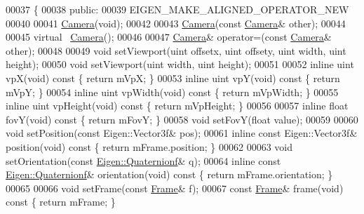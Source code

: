 \begin{DoxyCode}
00037 \{
00038   \textcolor{keyword}{public}:
00039     EIGEN\_MAKE\_ALIGNED\_OPERATOR\_NEW
00040 
00041     \hyperlink{class_camera}{Camera}(\textcolor{keywordtype}{void});
00042     
00043     \hyperlink{class_camera}{Camera}(\textcolor{keyword}{const} \hyperlink{class_camera}{Camera}& other);
00044     
00045     \textcolor{keyword}{virtual} ~\hyperlink{class_camera}{Camera}();
00046     
00047     \hyperlink{class_camera}{Camera}& operator=(\textcolor{keyword}{const} \hyperlink{class_camera}{Camera}& other);
00048     
00049     \textcolor{keywordtype}{void} setViewport(uint offsetx, uint offsety, uint width, uint height);
00050     \textcolor{keywordtype}{void} setViewport(uint width, uint height);
00051     
00052     \textcolor{keyword}{inline} uint vpX(\textcolor{keywordtype}{void})\textcolor{keyword}{ const }\{ \textcolor{keywordflow}{return} mVpX; \}
00053     \textcolor{keyword}{inline} uint vpY(\textcolor{keywordtype}{void})\textcolor{keyword}{ const }\{ \textcolor{keywordflow}{return} mVpY; \}
00054     \textcolor{keyword}{inline} uint vpWidth(\textcolor{keywordtype}{void})\textcolor{keyword}{ const }\{ \textcolor{keywordflow}{return} mVpWidth; \}
00055     \textcolor{keyword}{inline} uint vpHeight(\textcolor{keywordtype}{void})\textcolor{keyword}{ const }\{ \textcolor{keywordflow}{return} mVpHeight; \}
00056 
00057     \textcolor{keyword}{inline} \textcolor{keywordtype}{float} fovY(\textcolor{keywordtype}{void})\textcolor{keyword}{ const }\{ \textcolor{keywordflow}{return} mFovY; \}
00058     \textcolor{keywordtype}{void} setFovY(\textcolor{keywordtype}{float} value);
00059     
00060     \textcolor{keywordtype}{void} setPosition(\textcolor{keyword}{const} Eigen::Vector3f& pos);
00061     \textcolor{keyword}{inline} \textcolor{keyword}{const} Eigen::Vector3f& position(\textcolor{keywordtype}{void})\textcolor{keyword}{ const }\{ \textcolor{keywordflow}{return} mFrame.position; \}
00062 
00063     \textcolor{keywordtype}{void} setOrientation(\textcolor{keyword}{const} \hyperlink{group___geometry___module_class_eigen_1_1_quaternion}{Eigen::Quaternionf}& q);
00064     \textcolor{keyword}{inline} \textcolor{keyword}{const} \hyperlink{group___geometry___module_class_eigen_1_1_quaternion}{Eigen::Quaternionf}& orientation(\textcolor{keywordtype}{void})\textcolor{keyword}{ const }\{ \textcolor{keywordflow}{return} mFrame.orientation;
       \}
00065 
00066     \textcolor{keywordtype}{void} setFrame(\textcolor{keyword}{const} \hyperlink{class_frame}{Frame}& f);
00067     \textcolor{keyword}{const} \hyperlink{class_frame}{Frame}& frame(\textcolor{keywordtype}{void})\textcolor{keyword}{ const }\{ \textcolor{keywordflow}{return} mFrame; \}

\end{DoxyCode}
